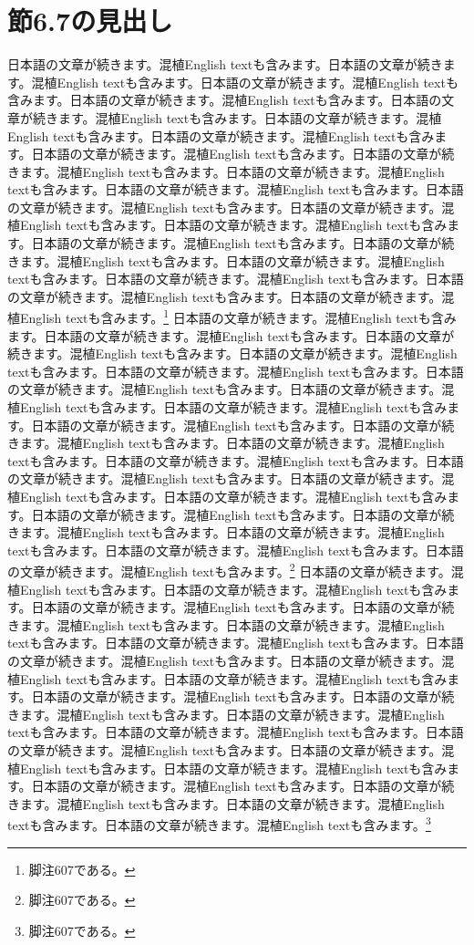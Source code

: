 \documentclass[pdflatex,book]{jlreq}
\begin{document}
\section{節6.7の見出し}
日本語の文章が続きます。混植English textも含みます。日本語の文章が続きます。混植English textも含みます。日本語の文章が続きます。混植English textも含みます。日本語の文章が続きます。混植English textも含みます。日本語の文章が続きます。混植English textも含みます。日本語の文章が続きます。混植English textも含みます。日本語の文章が続きます。混植English textも含みます。日本語の文章が続きます。混植English textも含みます。日本語の文章が続きます。混植English textも含みます。日本語の文章が続きます。混植English textも含みます。日本語の文章が続きます。混植English textも含みます。日本語の文章が続きます。混植English textも含みます。日本語の文章が続きます。混植English textも含みます。日本語の文章が続きます。混植English textも含みます。日本語の文章が続きます。混植English textも含みます。日本語の文章が続きます。混植English textも含みます。日本語の文章が続きます。混植English textも含みます。日本語の文章が続きます。混植English textも含みます。日本語の文章が続きます。混植English textも含みます。日本語の文章が続きます。混植English textも含みます。\footnote{脚注607である。}
日本語の文章が続きます。混植English textも含みます。日本語の文章が続きます。混植English textも含みます。日本語の文章が続きます。混植English textも含みます。日本語の文章が続きます。混植English textも含みます。日本語の文章が続きます。混植English textも含みます。日本語の文章が続きます。混植English textも含みます。日本語の文章が続きます。混植English textも含みます。日本語の文章が続きます。混植English textも含みます。日本語の文章が続きます。混植English textも含みます。日本語の文章が続きます。混植English textも含みます。日本語の文章が続きます。混植English textも含みます。日本語の文章が続きます。混植English textも含みます。日本語の文章が続きます。混植English textも含みます。日本語の文章が続きます。混植English textも含みます。日本語の文章が続きます。混植English textも含みます。日本語の文章が続きます。混植English textも含みます。日本語の文章が続きます。混植English textも含みます。日本語の文章が続きます。混植English textも含みます。日本語の文章が続きます。混植English textも含みます。日本語の文章が続きます。混植English textも含みます。\footnote{脚注607である。}
日本語の文章が続きます。混植English textも含みます。日本語の文章が続きます。混植English textも含みます。日本語の文章が続きます。混植English textも含みます。日本語の文章が続きます。混植English textも含みます。日本語の文章が続きます。混植English textも含みます。日本語の文章が続きます。混植English textも含みます。日本語の文章が続きます。混植English textも含みます。日本語の文章が続きます。混植English textも含みます。日本語の文章が続きます。混植English textも含みます。日本語の文章が続きます。混植English textも含みます。日本語の文章が続きます。混植English textも含みます。日本語の文章が続きます。混植English textも含みます。日本語の文章が続きます。混植English textも含みます。日本語の文章が続きます。混植English textも含みます。日本語の文章が続きます。混植English textも含みます。日本語の文章が続きます。混植English textも含みます。日本語の文章が続きます。混植English textも含みます。日本語の文章が続きます。混植English textも含みます。日本語の文章が続きます。混植English textも含みます。日本語の文章が続きます。混植English textも含みます。\footnote{脚注607である。}
\end{document}
